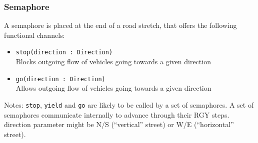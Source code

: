 \subsubsection{Semaphore}
A semaphore is placed at the end of a road stretch, that offers the following functional channels:
\begin{itemize}
	\item \texttt{stop(direction : Direction)}
	\\Blocks outgoing flow of vehicles going towards a given direction
	\item \texttt{go(direction : Direction)}
	\\Allows outgoing flow of vehicles going towards a given direction
\end{itemize}
Notes:
\texttt{stop}, \texttt{yield} and \texttt{go} are likely to be called by a set of semaphores.
A set of semaphores communicate internally to advance through their RGY steps.
direction parameter might be N/S (“vertical” street) or W/E (“horizontal” street).